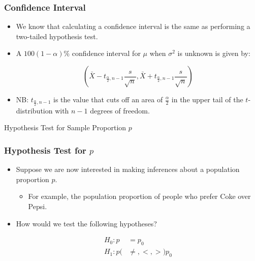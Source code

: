 \documentclass[14pt]{beamer}
\begin{document}
\begin{frame}
	\frametitle{Confidence Interval}
	
	\begin{itemize}[label={\color{blue}$\blacktriangleright$}]
		\item We know that calculating a confidence interval is the same as performing a two-tailed hypothesis test.
		
		\item A $100(1-\alpha)\%$ confidence interval for $\mu$ when $\sigma^2$ is unknown is given by:
		
		\[
		\left(\bar{X} - t_{\frac{\alpha}{2},n-1}\frac{s}{\sqrt{n}}, \bar{X} + t_{\frac{\alpha}{2},n-1}\frac{s}{\sqrt{n}}\right)
		\]
		
		\item NB: $t_{\frac{\alpha}{2},n-1}$ is the value that cuts off an area of $\frac{\alpha}{2}$ in the upper tail of the $t$-distribution with $n-1$ degrees of freedom.
	\end{itemize}
	
\end{frame}
	\begin{frame}
	\vspace{1cm}
	\centering
	{\color{blue}\large Hypothesis Test for Sample Proportion $p$}
\end{frame}
\begin{frame}
	\frametitle{Hypothesis Test for $p$}
	
	\begin{itemize}[label={\color{blue}$\blacktriangleright$}]
		\item Suppose we are now interested in making inferences about a population proportion $p$.
		\begin{itemize}[label={\color{blue}$\blacktriangleright$}]
			\item For example, the population proportion of people who prefer Coke over Pepsi.
		\end{itemize}
		
		\item How would we test the following hypotheses?
		
		\[
		\begin{aligned}
			H_0 : p &= p_0 \\
			H_1 : p(&\neq, <, >)p_0
		\end{aligned}
		\]
	\end{itemize}
	
\end{frame}
\end{document}
